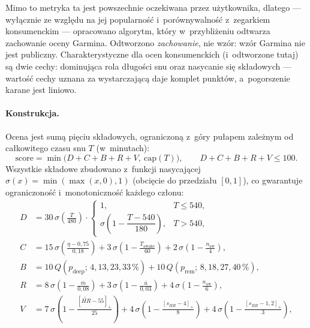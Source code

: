 \documentclass[12pt,a4paper,oneside]{report}
\begin{document}
Mimo to metryka ta jest powszechnie oczekiwana przez użytkownika, dlatego
--- wyłącznie ze względu na jej popularność i~porównywalność z~zegarkiem
konsumenckim --- opracowano algorytm, który w~przybliżeniu odtwarza
zachowanie oceny Garmina. Odtworzono \emph{zachowanie}, nie wzór: wzór Garmina
nie jest publiczny. Charakterystyczne dla ocen konsumenckich (i~odtworzone
tutaj) są dwie cechy: dominująca rola długości snu oraz nasycanie się składowych
--- wartość cechy uznana za wystarczającą daje komplet punktów, a~pogorszenie
karane jest liniowo.

\paragraph{Konstrukcja.} Ocena jest sumą pięciu składowych, ograniczoną z~góry
pułapem zależnym od całkowitego czasu snu $T$ (w~minutach):
\begin{equation}
  \mathrm{score} = \min\big(D + C + B + R + V,\ \mathrm{cap}(T)\big),
  \qquad D+C+B+R+V \leq 100 .
  \label{eq:sleep-score}
\end{equation}
Wszystkie składowe zbudowano z~funkcji nasycającej
$\sigma(x) = \min(\max(x,0),1)$ (obcięcie do przedziału $[0,1]$), co gwarantuje
ograniczoność i~monotoniczność każdego członu:
\begin{align}
  D &= 30\,\sigma\!\left(\frac{T}{480}\right) \cdot
       \begin{cases}
         1, & T \leq 540,\\[2pt]
         \sigma\!\left(1 - \dfrac{T-540}{180}\right), & T > 540,
       \end{cases}
       \label{eq:score-d}\\[2pt]
  C &= 15\,\sigma\!\left(\frac{\eta - 0{,}75}{0{,}18}\right)
     + 3\,\sigma\!\left(1 - \frac{T_{\text{awake}}}{60}\right)
     + 2\,\sigma\!\left(1 - \frac{n_{\text{aw}}}{4}\right),
       \label{eq:score-c}\\[2pt]
  B &= 10\,Q(p_{\text{deep}};\,4,13,23,33\,\%)
     + 10\,Q(p_{\text{rem}};\,8,18,27,40\,\%),
       \label{eq:score-b}\\[2pt]
  R &= 8\,\sigma\!\left(1 - \frac{\overline{m}}{0{,}08}\right)
     + 3\,\sigma\!\left(1 - \frac{\overline{u}}{0{,}03}\right)
     + 4\,\sigma\!\left(1 - \frac{n_{\text{aw}}}{6}\right),
       \label{eq:score-r}\\[2pt]
  V &= 7\,\sigma\!\left(1 - \frac{[\widetilde{HR} - 55]_+}{25}\right)
     + 4\,\sigma\!\left(1 - \frac{[s_{HR} - 4]_+}{8}\right)
     + 4\,\sigma\!\left(1 - \frac{[s_{RR} - 1{,}2]_+}{3}\right),
       \label{eq:score-v}
\end{align}
\end{document}
